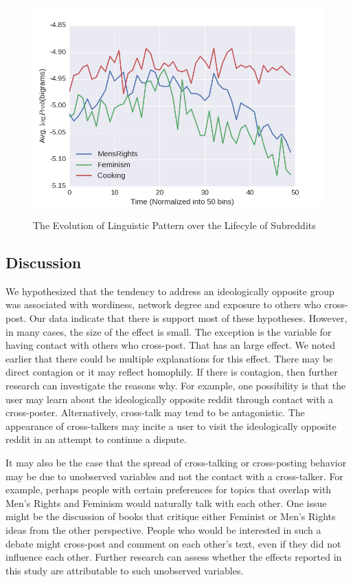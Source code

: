 \documentclass[letterpaper]{article}
\begin{document}
\begin{figure}[ht]
    \centering
    \includegraphics[scale=0.4]{images/LM_figure_2.png}
    \label{lm:fig2}
    \caption{The Evolution of Linguistic Pattern over the Lifecyle of Subreddits}
\end{figure}

\subsection{Discussion}

We hypothesized that the tendency to address an ideologically opposite group was associated with wordiness, network degree and exposure to others who cross-post. Our data indicate that there is support most of these hypotheses. However, in many cases, the size of the effect is  small. The exception is the variable for having contact with others who cross-post. That has an  large effect. We noted earlier that there could be multiple explanations for this effect. There may be direct contagion or it may reflect homophily. If there is contagion, then further research can investigate the reasons why. For example, one possibility is that the user may learn about the ideologically opposite reddit through contact with a cross-poster. Alternatively, cross-talk may tend to be antagonistic. The appearance of cross-talkers may incite a user to visit the ideologically opposite reddit in an attempt to continue a dispute. 

It may also be the case that the spread of cross-talking or cross-posting behavior may be due to unobserved variables and not the contact with a cross-talker. For example, perhaps people with certain preferences for topics that overlap with Men's Rights and Feminism would naturally talk with each other. One issue might be the discussion of books that critique either Feminist or Men's Rights ideas from the other perspective. People who would be interested in such a debate might cross-post and comment on each other's text, even if they did not influence each other. Further research can assess whether the effects reported in this study are attributable to such unobserved variables.
\end{document}
